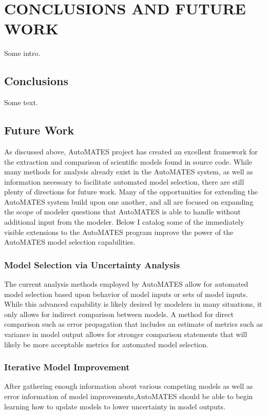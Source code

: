 \chapter{CONCLUSIONS AND FUTURE WORK\label{chapter:conc_and_future}}

Some intro.

\section{Conclusions\label{sec:conclusions}}

Some text.

\section{Future Work\label{sec:future_work}}
As discussed above, AutoMATES project has created an excellent framework for the extraction and comparison of scientific models found in source code. While many methods for analysis already exist in the AutoMATES system, as well as information necessary to facilitate automated model selection, there are still plenty of directions for future work. Many of the opportunities for extending the AutoMATES system build upon one another, and all are focused on expanding the scope of modeler questions that AutoMATES is able to handle without additional input from the modeler. Below I catalog some of the immediately visible extensions to the AutoMATES program improve the power of the AutoMATES model selection capabilities.

\subsection{Model Selection via Uncertainty Analysis \label{auto_uncert_analysis}}
The current analysis methods employed by AutoMATES allow for automated model selection based upon behavior of model inputs or sets of model inputs. While this advanced capability is likely desired by modelers in many situations, it only allows for indirect comparison between models. A method for direct comparison such as error propagation that includes an estimate of metrics such as variance in model output allows for stronger comparison statements that will likely be more acceptable metrics for automated model selection.

\subsection{Iterative Model Improvement\label{sec:auto_improve}}
After gathering enough information about various competing models as well as error information of model improvements,AutoMATES should be able to begin learning how to update models to lower uncertainty in model outputs.

